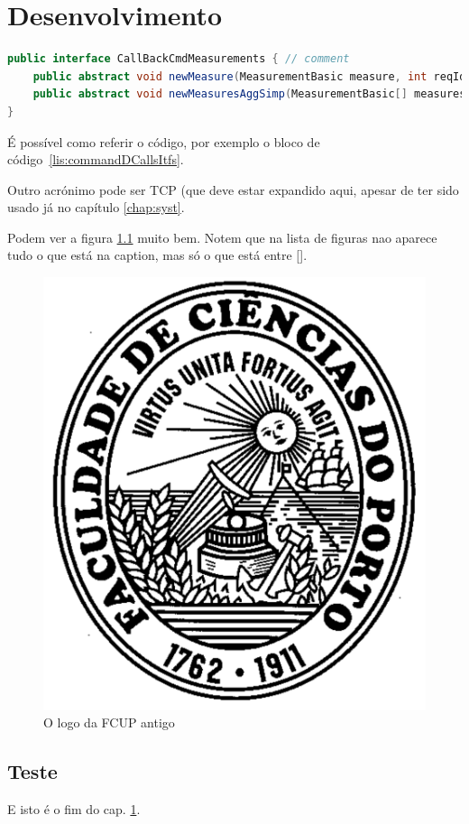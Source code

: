\chapter{Desenvolvimento}\label{chap:dese}

\begin{lstlisting}[numbers=none,language=java,caption={[CommandDaemonCallsItf]
   {CommandDaemon} callback interfaces},label=lis:commandDCallsItfs,float=htb]
public interface CallBackCmdMeasurements { // comment
	public abstract void newMeasure(MeasurementBasic measure, int reqId);
	public abstract void newMeasuresAggSimp(MeasurementBasic[] measuresAggSimp, 'A string');
}
\end{lstlisting}

É possível como referir o código, por exemplo o bloco de código~\ref{lis:commandDCallsItfs}.

Outro acrónimo pode ser \ac{TCP} (que deve estar expandido aqui, apesar de ter sido usado já no capítulo \ref{chap:syst}.

Podem ver a figura \ref{fig:logoFCUP} muito bem. Notem que na lista de figuras nao aparece tudo o que está na caption, mas só o que está entre [].



\begin{figure}[htb]
   \centering %
   \includegraphics[scale=.4]{pics/fc_logo}
   \caption[FCUP logo velho]{O logo da FCUP antigo}\label{fig:logoFCUP}
\end{figure}


\lipsum[3-7]
\section{Teste}
\lipsum[1]
E isto é o fim do cap. \ref{chap:dese}.

